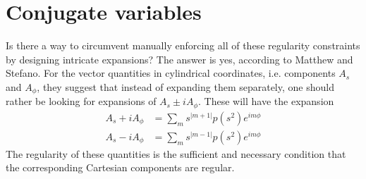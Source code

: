 \section{Conjugate variables}\label{sec:conjugate-var}


Is there a way to circumvent manually enforcing all of these regularity constraints by designing intricate expansions?
The answer is yes, according to Matthew and Stefano.
For the vector quantities in cylindrical coordinates, i.e. components $A_s$ and $A_\phi$, they suggest that instead of expanding them separately, one should rather be looking for expansions of $A_s \pm i A_\phi$. These will have the expansion
\begin{equation}\label{eqn:lin-combo-vector}
    \begin{aligned}
    A_s + iA_\phi &= \sum_m s^{|m+1|} p(s^2) e^{im\phi} \\ 
    A_s - iA_\phi &= \sum_m s^{|m-1|} p(s^2) e^{im\phi}
\end{aligned}
\end{equation}
The regularity of these quantities is the sufficient and necessary condition that the corresponding Cartesian components are regular.

